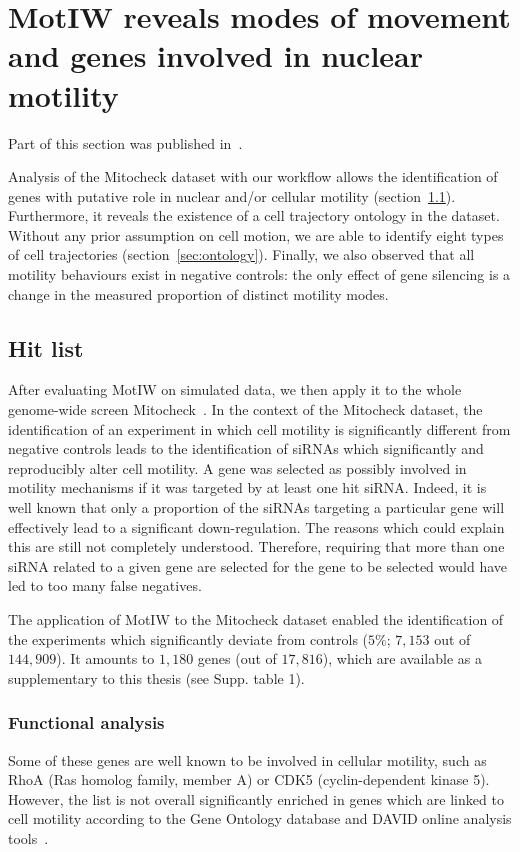 \section{MotIW reveals modes of movement and genes involved in nuclear
motility}
\label{sec:mitocheck}
Part of this section was published in~\cite{motiw}.

Analysis of the Mitocheck dataset with our workflow allows the
identification of genes with putative role in nuclear and/or cellular
motility (section~\ref{sec:hitlist}). Furthermore, it reveals the existence of
a cell trajectory ontology in the dataset. Without any prior
assumption on cell motion, we are able to identify eight types of cell
trajectories (section~\ref{sec:ontology}). Finally, we also observed
that all motility behaviours exist in negative controls: the only effect of gene silencing is a change in the measured proportion of distinct motility modes.

\subsection{Hit list}
\label{sec:hitlist}
After evaluating MotIW on simulated data, we then apply it to the
whole genome-wide screen Mitocheck~\cite{pmid20360735}. In the context
of the Mitocheck dataset, the identification of an experiment in which
cell motility is significantly different from negative controls leads
to the identification of siRNAs which significantly and reproducibly
alter cell motility. A gene was selected as possibly involved in
motility mechanisms if it was targeted by at least one hit
siRNA. Indeed, it is well known that only a proportion of the siRNAs
targeting a particular gene will effectively lead to a significant
down-regulation. 
The reasons which could explain this are still not completely
understood. Therefore, requiring that more than one siRNA related to a
given gene are selected for the gene to be selected would have led to
too many false negatives.

The application of MotIW to the Mitocheck dataset enabled the identification of the experiments which significantly deviate from controls ($5\%$; $7,153$ out of $144,909$). It amounts to $1,180$ genes (out of $17,816$), which are available as a supplementary to this thesis (see Supp. table 1).%


\subsubsection{Functional analysis} Some of these genes are well known to
be involved in cellular motility, such as RhoA (Ras homolog family,
member A) or CDK5 (cyclin-dependent kinase 5). However, the list is
not overall significantly enriched in genes which are linked to cell
motility according to the Gene Ontology database and DAVID online
analysis tools~\cite{pmid22543366}.  

